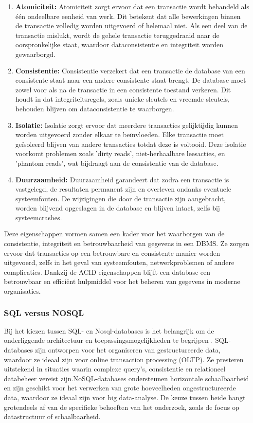\begin{enumerate}
    \item \textbf{Atomiciteit:} Atomiciteit zorgt ervoor dat een transactie wordt behandeld als één ondeelbare eenheid van werk. Dit betekent dat alle bewerkingen binnen de transactie volledig worden uitgevoerd of helemaal niet. Als een deel van de transactie mislukt, wordt de gehele transactie teruggedraaid naar de oorspronkelijke staat, waardoor dataconsistentie en integriteit worden gewaarborgd.
    
    \item \textbf{Consistentie:} Consistentie verzekert dat een transactie de database van een consistente staat naar een andere consistente staat brengt. De database moet zowel voor als na de transactie in een consistente toestand verkeren. Dit houdt in dat integriteitsregels, zoals unieke sleutels en vreemde sleutels, behouden blijven om dataconsistentie te waarborgen.
    
    \item \textbf{Isolatie:} Isolatie zorgt ervoor dat meerdere transacties gelijktijdig kunnen worden uitgevoerd zonder elkaar te beïnvloeden. Elke transactie moet geïsoleerd blijven van andere transacties totdat deze is voltooid. Deze isolatie voorkomt problemen zoals 'dirty reads', niet-herhaalbare leesacties, en 'phantom reads', wat bijdraagt aan de consistentie van de database.
    
    \item \textbf{Duurzaamheid:} Duurzaamheid garandeert dat zodra een transactie is vastgelegd, de resultaten permanent zijn en overleven ondanks eventuele systeemfouten. De wijzigingen die door de transactie zijn aangebracht, worden blijvend opgeslagen in de database en blijven intact, zelfs bij systeemcrashes.
\end{enumerate}

Deze eigenschappen vormen samen een kader voor het waarborgen van de consistentie, integriteit en betrouwbaarheid van gegevens in een DBMS. Ze zorgen ervoor dat transacties op een betrouwbare en consistente manier worden uitgevoerd, zelfs in het geval van systeemfouten, netwerkproblemen of andere complicaties. Dankzij de ACID-eigenschappen blijft een database een betrouwbaar en efficiënt hulpmiddel voor het beheren van gegevens in moderne organisaties.
\subsubsection{SQL versus NOSQL}
Bij het kiezen tussen SQL- en Nosql-databases is het belangrijk om de onderliggende architectuur en toepassingsmogelijkheden te begrijpen \autocite{khan2023performance}. SQL-databases zijn ontworpen voor het organiseren van gestructureerde data, waardoor ze ideaal zijn voor online transaction processing (OLTP). Ze presteren uitstekend in situaties waarin complexe query’s, consistentie en relationeel databeheer vereist zijn.NoSQL-databases ondersteunen horizontale schaalbaarheid en zijn geschikt voor het verwerken van grote hoeveelheden ongestructureerde data, waardoor ze ideaal zijn voor big data-analyse. De keuze tussen beide hangt grotendeels af van de specifieke behoeften van het onderzoek, zoals de focus op datastructuur of schaalbaarheid.

